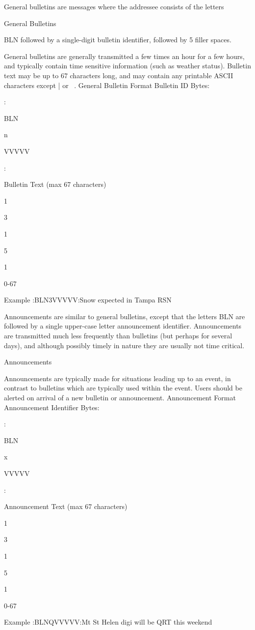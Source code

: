 {{{{General bulletins are messages where the addressee consists of the letters

General Bulletins

BLN followed by a single-digit bulletin identifier, followed by 5 filler spaces.

General bulletins are generally transmitted a few times an hour for a few
hours, and typically contain time sensitive information (such as weather
status).
Bulletin text may be up to 67 characters long, and may contain any printable
ASCII characters except | or ~.
General Bulletin Format
Bulletin
ID
Bytes:

:

BLN

n

VVVVV

:

Bulletin Text
(max 67 characters)

1

3

1

5

1

0-67

Example
:BLN3VVVVV:Snow expected in Tampa RSN

Announcements are similar to general bulletins, except that the letters BLN
are followed by a single upper-case letter announcement identifier.
Announcements are transmitted much less frequently than bulletins (but
perhaps for several days), and although possibly timely in nature they are
usually not time critical.

Announcements

Announcements are typically made for situations leading up to an event, in
contrast to bulletins which are typically used within the event.
Users should be alerted on arrival of a new bulletin or announcement.
Announcement Format
Announcement
Identifier
Bytes:

:

BLN

x

VVVVV

:

Announcement Text
(max 67 characters)

1

3

1

5

1

0-67

Example
:BLNQVVVVV:Mt St Helen digi will be QRT this weekend


}}}}
